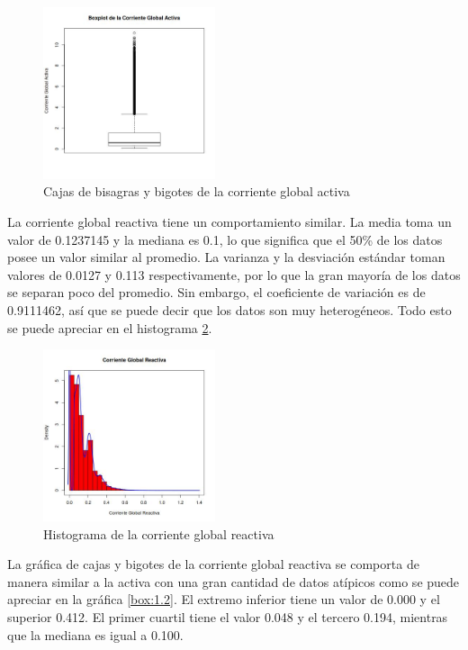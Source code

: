 \documentclass[a4paper,10pt,twocolumn]{report}
\begin{document}
	\begin{figure}[H]
	 	\centering
	 	\includegraphics[width=0.45\textwidth]{img/ex1/BoxPlots/BoxPlots_GAP.jpeg} 
	 	\caption{Cajas de bisagras y bigotes de la corriente global activa}
	 	\label{box:1.1}
	\end{figure}
	
	La corriente global reactiva tiene un comportamiento similar. La media toma un valor de 0.1237145 y la mediana es 0.1, lo que significa que el 50\% de los datos posee un valor similar al promedio. La varianza y la desviación estándar toman valores de 0.0127 y 0.113 respectivamente, por lo que la gran mayoría de los datos se separan poco del promedio. Sin embargo, el coeficiente de variación es de 0.9111462, así que se puede decir que los datos son muy heterogéneos. Todo esto se puede apreciar en el histograma \ref{hist:1.2}.
	
	\begin{figure}[H]
		\centering
		\includegraphics[width=0.45\textwidth]{img/ex1/Histograms/Histograms_GRP.jpeg} 
		\caption{Histograma de la corriente global reactiva}
		\label{hist:1.2}
	\end{figure}
	
	La gráfica de cajas y bigotes de la corriente global reactiva se comporta de manera similar a la activa con una gran cantidad de datos atípicos como se puede apreciar en la gráfica \ref{box:1.2}. El extremo inferior tiene un valor de 0.000 y el superior 0.412. El primer cuartil tiene el valor 0.048 y el tercero 0.194, mientras que la mediana es igual a 0.100.
	
\end{document}
